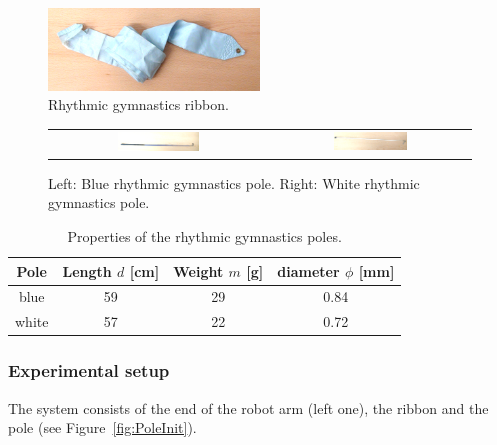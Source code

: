             \begin{figure}[h]
            \includegraphics[width=0.5\textwidth]{RibbonAdj.png}
            \centering
            \caption{Rhythmic gymnastics ribbon.}
            \label{fig:GymnasticRibbon}
            \end{figure}

            \begin{figure}
                \centering
                \begin{tabular}{cc}
                \includegraphics[width=0.39\textwidth]{BluePoleAdj.png}
                &
                \includegraphics[width=0.39\textwidth]{WhitePoleAdj.png}
                \end{tabular}
                \caption{Left: Blue rhythmic gymnastics pole. Right: White rhythmic gymnastics pole.}
                \label{fig:GymnasticPoles}
            \end{figure}


            \begin{table}[h]\centering
            \begin{tabular}{@{}cccc@{}}\toprule
            Pole & Length $d$ [cm] & Weight $m$ [g] & diameter $\phi$ [mm] \\ \midrule
            blue & 59 & 29 & 0.84\\
            white & 57 & 22 & 0.72\\

            \bottomrule
            \end{tabular}
            \caption{Properties of the rhythmic gymnastics poles.}
            \label{table:PoleProperties}
            \end{table}


        \subsubsection{Experimental setup}
            The system consists of the end of the robot arm (left one), the ribbon and the pole (see Figure~\ref{fig:PoleInit}).

